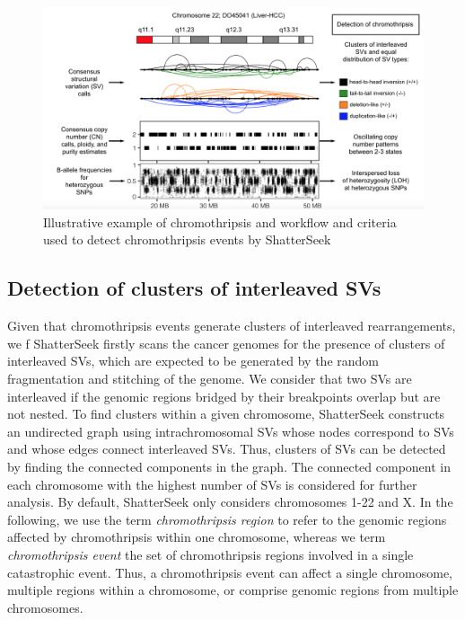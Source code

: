 \documentclass[twoside,a4wide,11pt]{article}\usepackage[]{graphicx}\usepackage[]{color}
\begin{document}
\begin{figure}[htb]
\begin{center}
\includegraphics[width=\textwidth]{workflow_tutorial.png}
\caption{Illustrative example of chromothripsis and workflow and criteria used to detect chromothripsis events by ShatterSeek}
\end{center}
\end{figure}

\subsection{Detection of clusters of interleaved SVs}

Given that chromothripsis events generate clusters of interleaved rearrangements, 
we f
ShatterSeek firstly scans the cancer genomes for the presence of clusters of interleaved SVs,
which are expected to be generated by the random fragmentation and stitching of the genome.
We consider that two SVs are interleaved if the genomic regions bridged by their breakpoints overlap but are not nested. 
To find clusters within a given chromosome, 
ShatterSeek constructs an undirected graph using intrachromosomal SVs 
whose nodes correspond to SVs and whose edges connect interleaved SVs. 
Thus, clusters of SVs can be detected by finding the connected components in the graph. 
The connected component in each chromosome with the highest number of SVs is considered for further analysis. 
By default, ShatterSeek only considers chromosomes 1-22 and X.
In the following, we use the term {\it chromothripsis region} to refer to the genomic regions affected by chromothripsis within one chromosome, whereas we term {\it chromothripsis event} the set of chromothripsis regions involved in a single catastrophic event.
Thus, a chromothripsis event can affect a single chromosome, multiple regions within a chromosome, or comprise genomic regions from multiple chromosomes.
\end{document}
